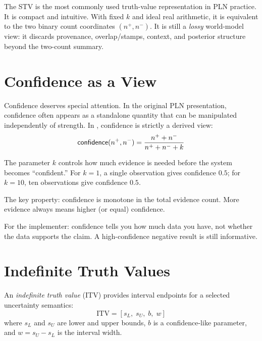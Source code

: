 \documentclass[11pt,openany]{report}
\begin{document}
The STV is the most commonly used truth-value representation in PLN
practice.  It is compact and intuitive.  With fixed $k$ and ideal real
arithmetic, it is equivalent to the two binary count coordinates
$(n^+,n^-)$.  It is still a \emph{lossy} world-model view: it discards
provenance, overlap/stamps, context, and posterior structure beyond the
two-count summary.


\section{Confidence as a View}

Confidence deserves special attention.  In the original PLN presentation,
confidence often appears as a standalone quantity that can be manipulated
independently of strength.  In \xiPLN{}, confidence is strictly a derived
view:
\[
  \mathsf{confidence}(n^+, n^-) = \frac{n^+ + n^-}{n^+ + n^- + k}
\]

The parameter $k$ controls how much evidence is needed before the system
becomes ``confident.''  For $k = 1$, a single observation gives
confidence $0.5$; for $k = 10$, ten observations give confidence
$0.5$.

The key property: confidence is monotone in the total evidence count.
More evidence always means higher (or equal) confidence.

For the implementer: confidence tells you how much data you have, not
whether the data supports the claim.  A high-confidence negative result
is still informative.

\section{Indefinite Truth Values}

An \emph{indefinite truth value} (ITV) provides interval endpoints for a
selected uncertainty semantics:
\[
  \mathrm{ITV} = [s_L,\; s_U,\; b,\; w]
\]
where $s_L$ and $s_U$ are lower and upper bounds, $b$ is a confidence-like
parameter, and $w = s_U - s_L$ is the interval width.
\end{document}
